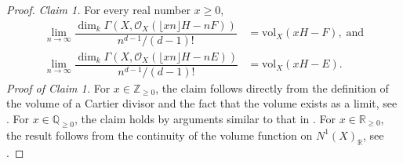 \documentclass[12pt,a4paper]{amsart}
\theoremstyle{plain}
\theoremstyle{definition}
\numberwithin{equation}{theorem}
\begin{document}
\begin{proof}
\vspace{0.6em}
\noindent\textit{Claim 1.} For every real number $x\geq 0$,
\begin{align*}
 \lim_{n\to\infty}\dfrac{\dim_k \Gamma \left(X,\mathcal{O}_X\left(\lfloor xn\rfloor H - nF\right)\right)}{n^{d-1}/(d-1)!} &= \mathrm{vol}_X(xH-F),\;\text{and}\\
 \lim_{n\to\infty}\dfrac{\dim_k \Gamma \left(X,\mathcal{O}_X\left(\lfloor xn\rfloor H - nE\right)\right)}{n^{d-1}/(d-1)!} &= \mathrm{vol}_X(xH-E).
\end{align*}
\textit{Proof of Claim 1.} For $x\in\mathbb{Z}_{\geq 0}$, the claim follows directly from the definition of the volume of a Cartier divisor and the fact that the volume exists as a limit, see \cite[Theorem A]{LM09}. For $x\in\mathbb{Q}_{\geq 0}$, the claim holds by arguments similar to that in \cite[Lemma 2.2.38]{Laz04a}. For $x\in\mathbb{R}_{\geq 0}$, the result follows from the continuity of the volume function on $N^1(X)_{\mathbb{R}}$, see \cite[Corollary 2.2.45]{Laz04a}.


\end{proof}
\end{document}
